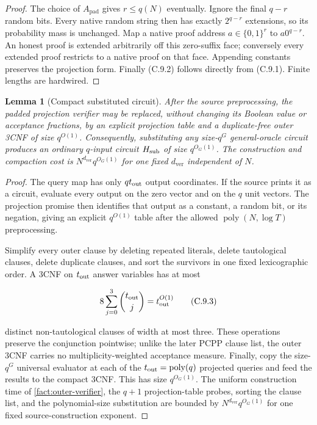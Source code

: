 \documentclass[11pt,letterpaper]{article}
\newcommand{\cref}[1]{\ref{#1}}
\newtheorem{lemma}[theorem]{Lemma}
\theoremstyle{definition}
\theoremstyle{remark}
\begin{document}
\begin{proof} The choice of \(A_{\mathrm{pad}}\) gives \(r\le q(N)\)
eventually. Ignore the final \(q-r\) random bits. Every native random
string then has exactly \(2^{q-r}\) extensions, so its probability mass
is unchanged. Map a native proof address \(a\in\{0,1\}^r\) to
\(a0^{q-r}\). An honest proof is extended arbitrarily off this
zero-suffix face; conversely every extended proof restricts to a native
proof on that face. Appending constants preserves the projection form.
Finally (C.9.2) follows directly from (C.9.1). Finite lengths are
hardwired. \end{proof}

\begin{lemma}[Compact substituted circuit]
\label{lem:compact-verifier}
After the source
preprocessing, the padded projection verifier may be replaced, without
changing its Boolean value or acceptance fractions, by an explicit
projection table and a duplicate-free outer 3CNF of size \(q^{O(1)}\).
Consequently, substituting any size-\(q^G\) general-oracle circuit
produces an ordinary \(q\)-input circuit \(H_{\rm sub}\) of size
\(q^{O_G(1)}\).
The construction and compaction cost is
\(N^{d_{\mathrm{ver}}}q^{O_G(1)}\) for one fixed \(d_{\mathrm{ver}}\)
independent of \(N\).
\end{lemma}

\begin{proof} The query map has only \(q t_{\rm out}\) output coordinates.
If the source prints it as a circuit, evaluate every output on the zero vector
and on the \(q\) unit vectors. The projection promise then identifies
that output as a constant, a random bit, or its negation, giving an
explicit \(q^{O(1)}\) table after the allowed
\(\operatorname{poly}(N,\log T)\) preprocessing.

Simplify every outer clause by deleting repeated literals, delete
tautological clauses, delete duplicate clauses, and sort the survivors
in one fixed lexicographic order. A 3CNF on \(t_{\rm out}\) answer
variables has at most

\[
8\sum_{j=0}^3\binom{t_{\rm out}}j=t_{\rm out}^{O(1)}
\tag{C.9.3}
\]

distinct non-tautological clauses of width at most three. These
operations preserve the conjunction pointwise; unlike the later PCPP
clause list, the outer 3CNF carries no multiplicity-weighted acceptance
measure. Finally, copy the size-\(q^G\) universal evaluator at each of
the \(t_{\rm out}=\operatorname{poly}(q)\) projected queries and feed the
results
to the compact 3CNF. This has size \(q^{O_G(1)}\). The uniform
construction time of \cref{fact:outer-verifier}, the \(q+1\)
projection-table probes, sorting the clause list, and the
polynomial-size substitution are bounded by
\(N^{d_{\mathrm{ver}}}q^{O_G(1)}\) for one fixed source-construction
exponent. \end{proof}
\end{document}

